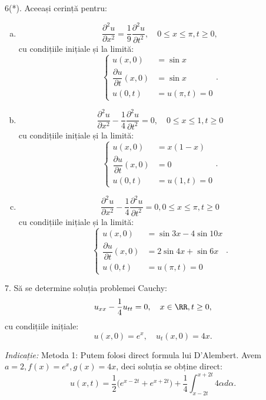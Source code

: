 6(*). Aceeași cerință pentru:
\begin{enumerate}[(a)]
    \item
        \[
            \dfrac{\partial^2 u}{\partial x^2} = \dfrac{1}{9}\dfrac{\partial^2 u}{\partial t^2}, %
            \quad 0 \leq x \leq \pi, t \geq 0,
        \]
        cu condițiile inițiale și la limită:
        \[
            \begin{cases}
                u(x, 0) &= \sin x \\
                \dfrac{\partial u}{\partial t}(x, 0) &= \sin x \\
                u(0, t) &= u(\pi, t) = 0
            \end{cases}.
        \]
    \item
        \[
            \dfrac{\partial^2 u}{\partial x^2} - \dfrac{1}{4} \dfrac{\partial^2 u}{\partial t^2} = 0, %
            \quad 0 \leq x \leq 1, t \geq 0
        \]
        cu condițiile inițiale și la limită:
        \[
            \begin{cases}
                u(x, 0) &= x(1 - x) \\
                \dfrac{\partial u}{\partial t}(x, 0) &= 0 \\
                u(0, t) &= u(1, t) = 0
            \end{cases}.
        \]
    \item
        \[
            \dfrac{\partial^2 u}{\partial x^2} - \dfrac{1}{4} \dfrac{\partial^2 u}{\partial t^2} = 0, %
            0 \leq x \leq \pi, t \geq 0
        \]
        cu condițiile inițiale și la limită:
        \[
            \begin{cases}
                u(x, 0) &= \sin 3x - 4\sin 10x \\
                \dfrac{\partial u}{\partial t}(x, 0) &= 2 \sin 4x + \sin 6x \\
                u(0, t) &= u(\pi, t) = 0
            \end{cases}.
        \]
\end{enumerate}

\vspace{0.3cm}

7. Să se determine soluția problemei Cauchy:
\[
    u_{xx} - \dfrac{1}{4} u_{tt} = 0, \quad x \in \RR, t \geq 0,
\]
cu condițiile inițiale:
\[
    u(x, 0) = e^x, \quad u_t(x, 0) = 4x.
\]

\emph{Indicație:} Metoda 1: Putem folosi direct formula lui D'Alembert. Avem
$ a = 2, f(x) = e^x, g(x) = 4x $, deci soluția se obține direct:
\[
    u(x, t) = \dfrac{1}{2} \Big( e^{x - 2t} + e^{x + 2t} \Big) + %
    \dfrac{1}{4} \int_{x - 2t}^{x + 2t} 4 \alpha d\alpha.
\]

